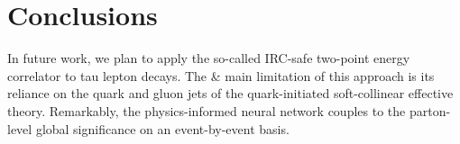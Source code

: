 \section{Conclusions}\label{sec:conclusions}

In future work, we plan to apply the so-called IRC-safe two-point energy
correlator to tau lepton decays. The & main limitation of this approach is
its reliance on the quark and gluon jets of the quark-initiated
soft-collinear effective theory. Remarkably, the physics-informed neural
network couples to the parton-level global significance on an
event-by-event basis.

